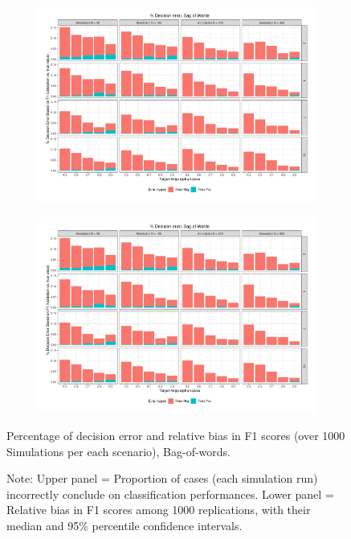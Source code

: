 \documentclass[man, 12pt, a4paper, nolmodern, noextraspace]{apa6}
\begin{document}
\begin{figure}
    \centering
    \begin{subfigure}[t]{0.95\textwidth}
        \centering
        \includegraphics[clip, width=\linewidth, page = 1]{Results/BoW_summary_05.pdf} 
    \end{subfigure}
    \begin{subfigure}[t]{0.95\textwidth}
        \centering
        \includegraphics[clip, width=\linewidth, page = 2]{Results/BoW_summary_05.pdf} 
    \end{subfigure}
    
    \captionsetup{format=hang}
    \caption{Percentage of decision error and relative bias in F1 scores (over 1000 Simulations per each scenario), Bag-of-words.} 
    \label{fig:Figure4}
    \captionsetup{font=small}
    \caption*{Note: Upper panel = Proportion of cases (each simulation run) incorrectly conclude on classification performances. Lower panel = Relative bias in F1 scores among 1000 replications, with their median and 95\% percentile confidence intervals.}
\end{figure}     
\end{document}
